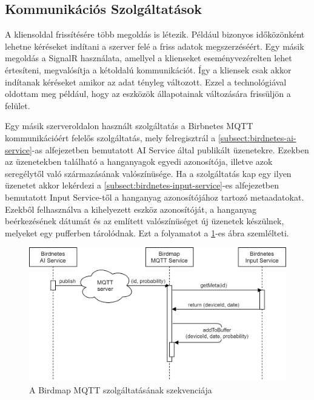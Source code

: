 \subsection{Kommunikációs Szolgáltatások}
A kliensoldal frissítésére több megoldás is létezik. Például bizonyos időközönként lehetne kéréseket indítani a szerver felé a friss adatok megszerzéséért.
Egy másik megoldás a SignalR használata, amellyel a klienseket eseményvezérelten lehet értesíteni, megvalósítja a kétoldalú kommunikációt.
Így a kliensek csak akkor indítanak kéréseket amikor az adat tényleg változott. Ezzel a technológiával oldottam meg például, hogy az eszközök állapotainak változására
frissüljön a felület.

Egy másik szerveroldalon használt szolgáltatás a Birbnetes MQTT kommunikációért felelős szolgáltatás, 
mely felregisztrál a \ref{subsect:birdnetes-ai-service}-as alfejezetben bemutatott AI Service által publikált üzenetekre.
Ezekben az üzenetekben található a hanganyagok egyedi azonosítója, illetve azok seregélytől való származásának valószínüsége.
Ha a szolgáltatás kap egy ilyen üzenetet akkor lekérdezi a \ref{subsect:birdnetes-input-service}-es alfejezetben bemutatott Input Service-től
a hanganyag azonosítójához tartozó metaadatokat. 
Ezekből felhasználva a kihelyezett eszköz azonosítóját, a hanganyag beérkezésének dátumát és az említett valószínüséget új üzenetek készülnek, melyeket egy pufferben tárolódnak.
Ezt a folyamatot a \ref{fig:birdmap-mqtt-service}-es ábra szemlélteti.

\begin{figure}[!ht]
    \centering
    \includegraphics[width=150mm, keepaspectratio]{figures/mqtt-communication-sequence.png}
    \caption{A Birdmap MQTT szolgáltatásának szekvenciája}
    \label{fig:birdmap-mqtt-service}
\end{figure}

